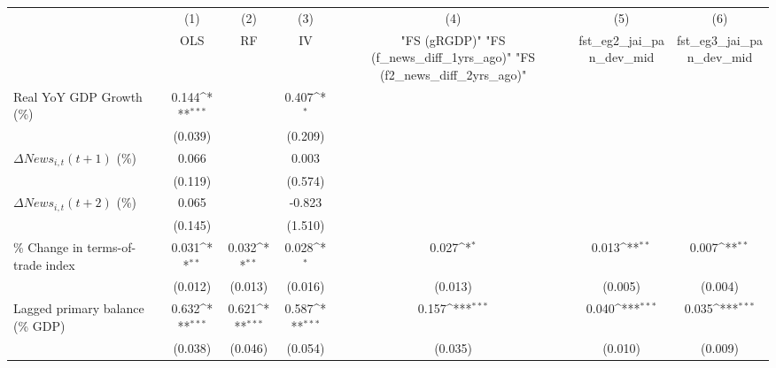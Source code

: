 {
\def\sym#1{\ifmmode^{#1}\else\(^{#1}\)\fi}
\begin{tabular}{l*{6}{c}}
\toprule
                    &\multicolumn{1}{c}{(1)}&\multicolumn{1}{c}{(2)}&\multicolumn{1}{c}{(3)}&\multicolumn{1}{c}{(4)}&\multicolumn{1}{c}{(5)}&\multicolumn{1}{c}{(6)}\\
                    &\multicolumn{1}{c}{OLS}&\multicolumn{1}{c}{RF}&\multicolumn{1}{c}{IV}&\multicolumn{1}{c}{ "FS (gRGDP)"  "FS (f_news_diff_1yrs_ago)"  "FS (f2_news_diff_2yrs_ago)" }&\multicolumn{1}{c}{fst_eg2_jai_pan_dev_mid}&\multicolumn{1}{c}{fst_eg3_jai_pan_dev_mid}\\
\midrule
Real YoY GDP Growth (\%)&       0.144\sym{***}&                     &       0.407\sym{*}  &                     &                     &                     \\
                    &     (0.039)         &                     &     (0.209)         &                     &                     &                     \\
\addlinespace
$ \Delta News_{i,t}(t+1)$ (\%)&       0.066         &                     &       0.003         &                     &                     &                     \\
                    &     (0.119)         &                     &     (0.574)         &                     &                     &                     \\
\addlinespace
$ \Delta News_{i,t}(t+2)$ (\%)&       0.065         &                     &      -0.823         &                     &                     &                     \\
                    &     (0.145)         &                     &     (1.510)         &                     &                     &                     \\
\addlinespace
\% Change in terms-of-trade index&       0.031\sym{**} &       0.032\sym{**} &       0.028\sym{*}  &       0.027\sym{*}  &       0.013\sym{**} &       0.007\sym{**} \\
                    &     (0.012)         &     (0.013)         &     (0.016)         &     (0.013)         &     (0.005)         &     (0.004)         \\
\addlinespace
Lagged primary balance (\% GDP)&       0.632\sym{***}&       0.621\sym{***}&       0.587\sym{***}&       0.157\sym{***}&       0.040\sym{***}&       0.035\sym{***}\\
                    &     (0.038)         &     (0.046)         &     (0.054)         &     (0.035)         &     (0.010)         &     (0.009)         \\

\end{tabular}}
